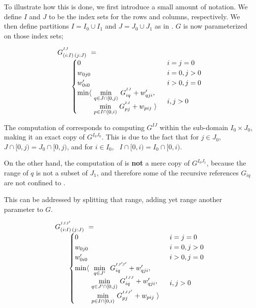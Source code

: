 To illustrate how this is done, we first introduce a small amount of notation. 
We define $I$ and $J$ to be the index sets for the rows and columns, respectively.
We then define partitions $I=I_0\cup I_1$ and $J=J_0\cup J_1$ as in .
$G$ is now parameterized on those index sets;

\begin{equation}
\begin{array}{l@{}l}
	G^{^{IJ}}_{(i:I)\,(j:J)} ~=~  \\
	\qquad
	\begin{cases}
		0                         & i=j=0 \\
		w_{0j0}                   & i=0, j>0 \\
		w'_{0i0}                  & i>0, j=0 \\
		\begin{array}{@{}l@{~}l}
		  \min\langle & \underset{q\in J\cap[0,j)}\min ~ G^{^{IJ}}_{iq} + \yw{qji}, \\
		              & \underset{p\in I\cap[0,i)}\min ~ G^{^{IJ}}_{pj} + \xw{pij}~\rangle
		\end{array}              & i,j>0
	\end{cases}
\end{array}
\end{equation}

The computation of  corresponds to computing $G^{IJ}$ within the sub-domain 
$I_0\times J_0$, making it an exact copy of $G^{I_0J_0}$. This is due to the fact
that for $j\in J_0$, ~$J\cap[0,j)=J_0\cap[0,j)$, and for $i\in I_0$, ~$I\cap[0,i)=I_0\cap[0,i)$.

On the other hand, the computation of  is {\bf not} a mere copy of $G^{I_0J_1}$, 
because the range of $q$ is not a subset of $J_1$, and therefore 
some of the recursive references $G_{iq}$ are not confined to .

This can be addressed by splitting that range, adding yet range another parameter to $G$.

\begin{equation}\LeftEqNo
\begin{array}{l@{}l}
	G^{^{IJJ'}}_{(i:I)\,(j:J)} ~=~  \\
	\qquad
	\begin{cases}
		0                         & i=j=0 \\
		w_{0j0}                   & i=0, j>0 \\
		w'_{0i0}                  & i>0, j=0 \\
		\begin{array}{@{}l@{~}l}
		  \min\langle & \underset{~q\in J'~}\min ~ G^{^{IJ'\!J'}}_{iq} + \yw{qji}, \\
		              & \underset{q\in J'\cap[0,j)}\min ~ G^{^{IJJ}}_{iq} + \yw{qji}, \\
		              & \underset{p\in I\cap[0,i)}\min ~ G^{^{IJJ'}}_{pj} + \xw{pij}~\rangle
		\end{array}              & i,j>0
	\end{cases}
\end{array}
\end{equation}

